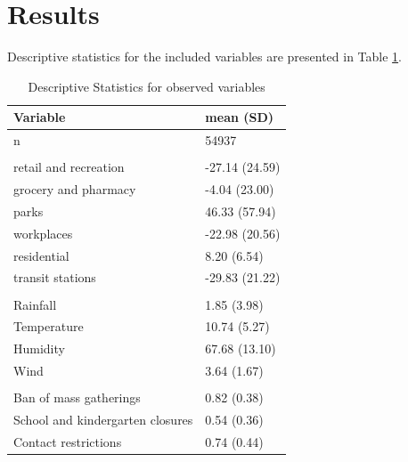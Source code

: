 \documentclass[]{elsarticle} %
\begin{document}
\section{Results}\label{results}

Descriptive statistics for the included variables are presented in Table
\ref{tab:descriptive-vars}.

\begin{table}

\caption{\label{tab:descriptive-vars}Descriptive Statistics for observed variables}
\centering
\fontsize{7}{9}\selectfont
\begin{tabular}[t]{ll}
\toprule
Variable & mean (SD)\\
\midrule
n & 54937\\
\addlinespace[0.3em]
\multicolumn{2}{l}{\textbf{Mobility}}\\
\hspace{1em}retail and recreation & -27.14 (24.59)\\
\hspace{1em}grocery and pharmacy & -4.04 (23.00)\\
\hspace{1em}parks & 46.33 (57.94)\\
\hspace{1em}workplaces & -22.98 (20.56)\\
\hspace{1em}residential & 8.20 (6.54)\\
\hspace{1em}transit stations & -29.83 (21.22)\\
\addlinespace[0.3em]
\multicolumn{2}{l}{\textbf{Weather}}\\
\hspace{1em}Rainfall & 1.85 (3.98)\\
\hspace{1em}Temperature & 10.74 (5.27)\\
\hspace{1em}Humidity & 67.68 (13.10)\\
\hspace{1em}Wind & 3.64 (1.67)\\
\addlinespace[0.3em]
\multicolumn{2}{l}{\textbf{Policies}}\\
\hspace{1em}Ban of mass gatherings & 0.82 (0.38)\\
\hspace{1em}School and kindergarten closures & 0.54 (0.36)\\
\hspace{1em}Contact restrictions & 0.74 (0.44)\\

\end{tabular}
\end{table}
\end{document}
